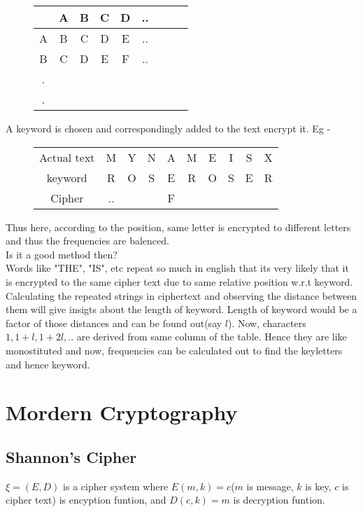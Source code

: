 \documentclass[english, 11pt]{article}
\begin{document}
\begin{figure}[ht]
  \centering
      \begin{tabular}{|c|c|c|c|c|c|c|c|c|}
          \hline
            & A & B & C & D & ..\\
          \hline
          A & B & C & D & E & ..\\
          B & C & D & E & F & ..\\
          . &   &   &   &   &   \\
          . &   &   &   &   &   \\
          \hline
      \end{tabular}
\end{figure}
A keyword is chosen and correspondingly added to the text encrypt it. Eg -
\begin{figure}[ht]
  \centering
      \begin{tabular}{|c|ccccccccc|}
          \hline
          Actual text & M & Y & N & A & M & E & I & S & X \\
          keyword     & R & O & S & E & R & O & S & E & R \\
          \hline
          Cipher      & .. &   &   & F &   &   &   &   & \\
          \hline
      \end{tabular}
\end{figure}
Thus here, according to the position, same letter is encrypted to different letters and thus the frequencies are balenced.\\
Is it a good method then? \\
Words like "THE", "IS", etc repeat so much in english that its very likely that it is encrypted to the same cipher text due to same relative position w.r.t keyword. Calculating the repeated strings in ciphertext and observing the distance between them will give insigts about the length of keyword.
Length of keyword would be a factor of those distances and can be found out(say $l$). Now, characters $1,1+l,1+2l,..$ are derived from same column of the table. Hence they are like monostituted and now, frequencies can be calculated out to find the keyletters and hence keyword.

\section*{Mordern Cryptography}
\subsection*{Shannon's Cipher}
$\xi = (E,D)$ is a cipher system where $E(m,k) = c$($m$ is message, $k$ is key, $c$ is cipher text) is encyption funtion, and $D(c,k) = m$ is decryption funtion.
\end{document}

